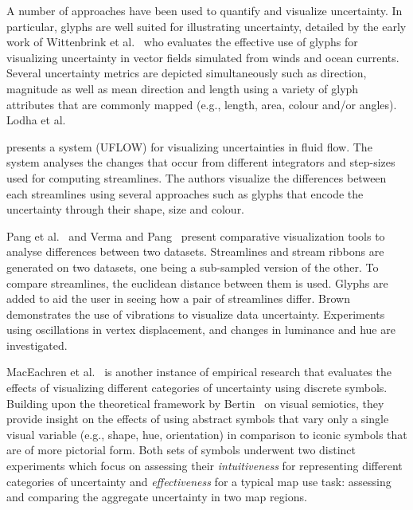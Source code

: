 A number of approaches have been used to quantify and visualize uncertainty. In particular, glyphs are well suited for illustrating uncertainty, detailed by the early work of
Wittenbrink et al.~\cite{wittenbrink96} who evaluates the effective use of glyphs for visualizing uncertainty in vector fields simulated from winds and ocean currents. 
Several uncertainty metrics are depicted simultaneously such as direction, magnitude as well as mean direction and length using a variety of glyph attributes that are commonly mapped (e.g., length, area, colour and/or angles). 
Lodha et al.~{\cite{lodha96} presents a system (UFLOW) for visualizing uncertainties in fluid flow. The system analyses the changes that occur from different integrators and step-sizes used for computing streamlines. The authors visualize the differences between each streamlines using several approaches such as glyphs that encode the uncertainty through their shape, size and colour. 

Pang et al.~\cite{pang96} and Verma and Pang~\cite{verma04} present comparative visualization tools to analyse differences between two datasets. Streamlines and stream ribbons are generated on two datasets, one being a sub-sampled version of the other. To compare streamlines, the euclidean distance between them is used. Glyphs are added to aid the user in seeing how a pair of streamlines differ.
Brown~\cite{brown04} demonstrates the use of vibrations to visualize data uncertainty. Experiments using oscillations in vertex displacement, and changes in luminance and hue are investigated.

MacEachren et al.~\cite{maceachren12visualSemiotics} is another instance of empirical research that evaluates the effects of visualizing different categories of uncertainty using discrete symbols.
Building upon the theoretical framework by Bertin~\cite{bertin83semiologyOfGraphics} on visual semiotics, they provide insight on the effects of using abstract symbols that vary only a single visual variable (e.g., shape, hue, orientation) in comparison to iconic symbols that are of more pictorial form.
Both sets of symbols underwent two distinct experiments which focus on assessing their \emph{intuitiveness} for representing different categories of uncertainty and \emph{effectiveness} for a typical map use task: assessing and comparing the aggregate uncertainty in two map regions.

}
